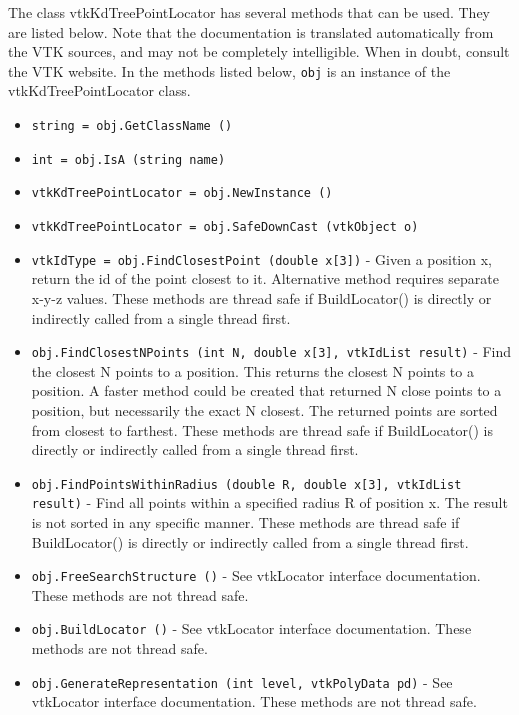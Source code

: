 The class vtkKdTreePointLocator has several methods that can be used.
  They are listed below.
Note that the documentation is translated automatically from the VTK sources,
and may not be completely intelligible.  When in doubt, consult the VTK website.
In the methods listed below, \verb|obj| is an instance of the vtkKdTreePointLocator class.
\begin{itemize}
\item  \verb|string = obj.GetClassName ()|

\item  \verb|int = obj.IsA (string name)|

\item  \verb|vtkKdTreePointLocator = obj.NewInstance ()|

\item  \verb|vtkKdTreePointLocator = obj.SafeDownCast (vtkObject o)|

\item  \verb|vtkIdType = obj.FindClosestPoint (double x[3])| -  Given a position x, return the id of the point closest to it. Alternative
 method requires separate x-y-z values.
 These methods are thread safe if BuildLocator() is directly or
 indirectly called from a single thread first.

\item  \verb|obj.FindClosestNPoints (int N, double x[3], vtkIdList result)| -  Find the closest N points to a position. This returns the closest
 N points to a position. A faster method could be created that returned
 N close points to a position, but necessarily the exact N closest.
 The returned points are sorted from closest to farthest.
 These methods are thread safe if BuildLocator() is directly or
 indirectly called from a single thread first.

\item  \verb|obj.FindPointsWithinRadius (double R, double x[3], vtkIdList result)| -  Find all points within a specified radius R of position x.
 The result is not sorted in any specific manner.
 These methods are thread safe if BuildLocator() is directly or
 indirectly called from a single thread first.

\item  \verb|obj.FreeSearchStructure ()| -  See vtkLocator interface documentation.
 These methods are not thread safe.

\item  \verb|obj.BuildLocator ()| -  See vtkLocator interface documentation.
 These methods are not thread safe.

\item  \verb|obj.GenerateRepresentation (int level, vtkPolyData pd)| -  See vtkLocator interface documentation.
 These methods are not thread safe.

\end{itemize}
